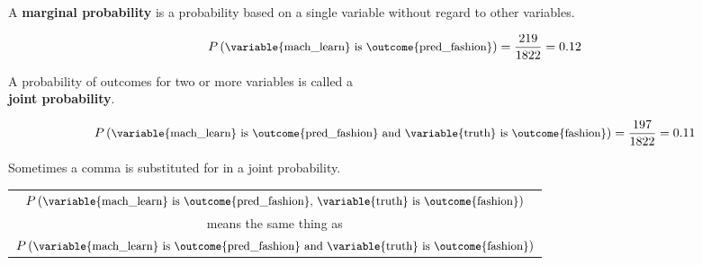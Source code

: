 \documentclass{beamer}
\newcommand{\prob}[1]{P\left(#1\right)}
\begin{document}
\begin{frame}
\begin{definition}
A \textbf{marginal probability} is a probability based on a single variable without regard to other variables.
\end{definition}\pause

\begin{example}
\begin{equation*}
\prob{\small\text{\variable{mach\_learn} is \outcome{pred\_fashion}}} = \dfrac{219}{1822} = 0.12
\end{equation*}\pause
\vspace{-3.5mm}
\end{example}

\begin{definition}
A probability of outcomes for two or more variables is called a\\ \textbf{joint probability}.
\end{definition}\pause

\begin{example}
\vspace{-4mm}
\begin{equation*}
\prob{\small\text{\variable{mach\_learn} is \outcome{pred\_fashion} and \variable{truth} is \outcome{fashion}}} = \dfrac{197}{1822} = 0.11
\end{equation*}
\vspace{-4.5mm}
\end{example}
\end{frame}

\begin{frame}
\begin{note}
Sometimes a comma is substituted for  in a joint probability.

\vspace{-1mm}
\begin{center}
\begin{tabular}{c}
$\prob{\small\text{\variable{mach\_learn} is \outcome{pred\_fashion}, \variable{truth} is \outcome{fashion}}}$ \\
means the same thing as \\
$\prob{\small\text{\variable{mach\_learn} is \outcome{pred\_fashion} and \variable{truth} is \outcome{fashion}}}$
\end{tabular}
\end{center}
\end{note}
\end{frame}
\end{document}
